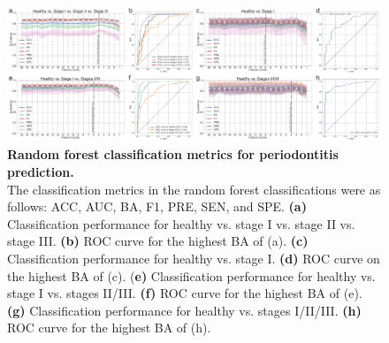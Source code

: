 \documentclass[11pt, a4paper, onecolumn, oneside]{report}
\begin{document}
            \begin{figure}[p]
                \centering
                \includegraphics[width=\linewidth]{Figures/Periodontitis/Figure_4.pdf}
                \caption[Random forest classification metrics for periodontitis prediction]{\textbf{Random forest classification metrics for periodontitis prediction.}\\
                    The classification metrics in the random forest classifications were as follows: ACC, AUC, BA, F1, PRE, SEN, and SPE. \textbf{(a)} Classification performance for healthy vs. stage I vs. stage II vs. stage III. \textbf{(b)} ROC curve for the highest BA of (a). \textbf{(c)} Classification performance for healthy vs. stage I. \textbf{(d)} ROC curve on the highest BA of (c). (\textbf{e)} Classification performance for healthy vs. stage I vs. stages II/III. \textbf{(f)} ROC curve for the highest BA of (e). \textbf{(g)} Classification performance for healthy vs. stages I/II/III. \textbf{(h)} ROC curve for the highest BA of (h).}
                \label{fig:Periodontitis-ML}
            \end{figure}
            \clearpage
\end{document}

